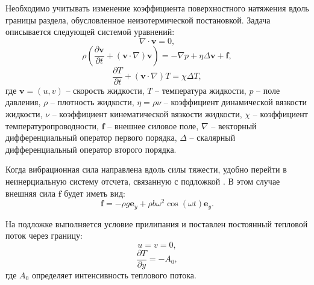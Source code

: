 \documentclass[12pt,a4paper]{article}
\begin{document}
Необходимо учитывать изменение коэффициента поверхностного натяжения вдоль границы раздела, обусловленное неизотермической постановкой. Задача описывается следующей системой уравнений:
\begin{equation}
	\nabla \cdot \mathbf{v} = 0,
\end{equation}
\begin{equation}
	\rho \left( \frac{\partial \mathbf{v}}{\partial t} + (\mathbf{v} \cdot \nabla)\mathbf{v} \right) = -\nabla p + \eta \Delta \mathbf{v} + \mathbf{f},
\end{equation}
\begin{equation}
	\frac{\partial T}{\partial t} + (\mathbf{v} \cdot \nabla)T = \chi \Delta T,
\end{equation}
где $\mathbf{v} = (u,v)$ -- скорость жидкости, $T$ -- температура жидкости, $p$ -- поле давления, $\rho$ -- плотность жидкости, $\eta=\rho \nu$ -- коэффициент динамической вязкости жидкости, $\nu$ -- коэффициент кинематической вязкости жидкости,  $\chi$ -- коэффициент температуропроводности, $\mathbf{f}$ -- внешнее силовое поле, $\nabla$ -- векторный дифференциальный оператор первого порядка, $\Delta$ -- скалярный дифференциальный оператор второго порядка.

Когда вибрационная сила направлена вдоль силы тяжести, удобно перейти в неинерциальную систему отсчета, связанную с подложкой \cite{Lyubimov2003, Shklyaev2008, Shklyaev2015, Mancebo2002}. В этом случае внешняя сила $\mathbf{f}$ будет иметь вид: 
\begin{equation*}
	\mathbf{f} = - \rho g \mathbf{e}_y + \rho b \omega^2 \cos(\omega t) \mathbf{e}_y.
\end{equation*}

На подложке выполняется условие прилипания и поставлен постоянный тепловой поток через границу:
\begin{equation}
	u = v = 0,
\end{equation}
\begin{equation}\label{eq:low_thermal_diffusivity_bc_thermal}
	\frac{\partial T}{\partial y} = -A_0,
\end{equation}
где $A_0$ определяет интенсивность теплового потока.
\end{document}
